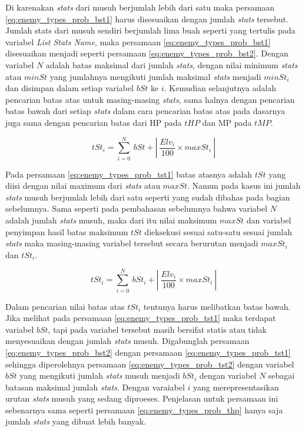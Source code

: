 Di karenakan \textit{stats} dari musuh berjumlah lebih dari satu maka persamaan \ref{eq:enemy_types_prob_bst1} harus disesuaikan dengan jumlah \textit{stats} tersebut. Jumlah stats dari musuh sendiri berjumlah lima buah seperti yang tertulis pada variabel \textit{List Stats Name}, maka persamaan \ref{eq:enemy_types_prob_bst1} disesuaikan menjadi seperti persamaan \ref{eq:enemy_types_prob_bst2}. Dengan variabel $N$ adalah batas maksimal dari jumlah \textit{stats}, dengan nilai minimum \textit{stats} atau $minSt$ yang jumlahnya mengikuti jumlah maksimal \textit{stats} menjadi $minSt_{i}$ dan disimpan dalam setiap variabel $bSt$ ke $i$. Kemudian selanjutnya adalah pencarian batas atas untuk masing-masing \textit{stats}, sama halnya dengan pencarian batas bawah dari setiap \textit{stats} dalam cara pencarian batas atas pada dasarnya juga sama dengan pencarian batas dari HP pada $tHP$ dan MP pada $tMP$.

\begin{equation}\label{eq:enemy_types_prob_tst1}
tSt_{i} = \sum_{i=0}^{N}\ bSt + \left |\ \frac{Elv_{i}}{100} \times maxSt_{i}\ \right |
\end{equation}

Pada persamaan \ref{eq:enemy_types_prob_tst1} batas atasnya adalah $tSt$ yang diisi dengan nilai maximum dari \textit{stats} atau $maxSt$. Namun pada kasus ini jumlah \textit{stats} musuh berjumlah lebih dari satu seperti yang sudah dibahas pada bagian sebelumnya. Sama seperti pada pembahasan sebelumnya bahwa variabel $N$ adalah jumlah \textit{stats} musuh, maka dari itu nilai maksimum $maxSt$ dan variabel penyimpan hasil batas maksimum $tSt$ dieksekusi sesuai satu-satu sesuai jumlah \textit{stats} maka masing-masing variabel tersebut secara berurutan menjadi $maxSt_{i}$ dan $tSt_{i}$.

\begin{equation}\label{eq:enemy_types_prob_tst2}
tSt_{i} = \sum_{i=0}^{N}\ bSt_{i} + \left |\ \frac{Elv_{i}}{100} \times maxSt_{i}\ \right |
\end{equation}

Dalam pencarian nilai batas atas $tSt_{i}$ tentunya harus melibatkan batas bawah. Jika melihat pada persamaan \ref{eq:enemy_types_prob_tst1} maka terdapat variabel $bSt$, tapi pada variabel tersebut masih bersifat statis atau tidak menyesuaikan dengan jumlah \textit{stats} musuh. Digabunglah persamaan \ref{eq:enemy_types_prob_bst2} dengan persamaan \ref{eq:enemy_types_prob_tst1} sehingga diperolehnya persamaan \ref{eq:enemy_types_prob_tst2} dengan variabel $bSt$ yang mengikuti jumlah \textit{stats} musuh menjadi $bSt_{i}$ dengan variabel $N$ sebagai batasan maksimal jumlah \textit{stats}. Dengan varaiabel $i$ yang merepresentasikan urutan \textit{stats} musuh yang sedang diproeses. Penjelasan untuk persamaan ini sebenarnya sama seperti persamaan \ref{eq:enemy_types_prob_thp} hanya saja jumlah \textit{stats} yang dibuat lebih banyak.

